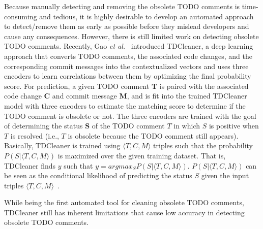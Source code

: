 Because manually detecting and removing the obsolete TODO comments is
time-consuming and tedious, it is highly desirable to develop an
automated approach to detect/remove them as early as possible before
they mislead developers and cause any consequences. However, there is
still limited work on detecting obsolete TODO comments. Recently, Gao
{\em et al.}~\cite{tdcleaner-fse21} introduced TDCleaner, a deep
learning approach that converts TODO comments, the associated code
changes, and the corresponding commit messages into the contextualized
vectors and uses three encoders to learn correlations between them by
optimizing the final probability score. For prediction, a given TODO
comment {\bf T} is paired with the associated code change {\bf C} and
commit message {\bf M}, and is fit into the trained TDCleaner model
with three encoders to estimate the matching score to determine if the
TODO comment is obsolete or not. The three encoders are trained with
the goal of determining the status {\bf S} of the TODO comment $T$ in
which $S$ is positive when $T$ is resolved (i.e., $T$ is obsolete
because the TODO comment still appears). Basically, TDCleaner is
trained using $\langle T, C, M \rangle$ triples such that the
probability $P(S | \langle T, C, M \rangle)$ is maximized over the
given training dataset. That is, TDCleaner finds $y$ such that $y =
argmax_S P (S | \langle T, C, M \rangle)$. $P(S | \langle T, C, M
\rangle)$ can be seen as the conditional likelihood of predicting the
status $S$ given the input triples $\langle T, C, M
\rangle$~\cite{tdcleaner-fse21}.

While being the first automated tool for cleaning obsolete TODO
comments, TDCleaner still has inherent limitations that cause low
accuracy in detecting obsolete TODO comments.

